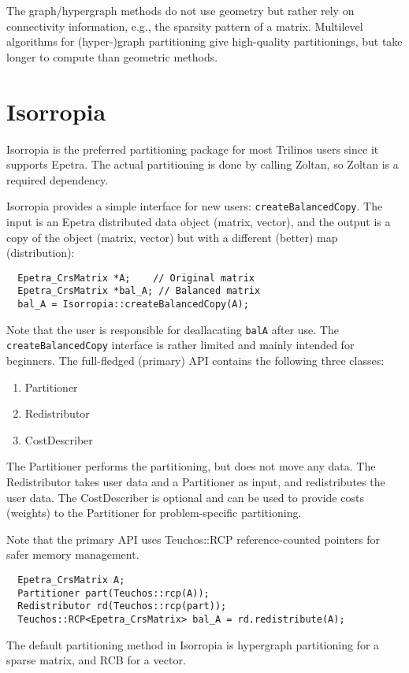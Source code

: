 The graph/hypergraph methods do not use geometry but rather rely on connectivity information, e.g., the sparsity pattern of a matrix. Multilevel algorithms for (hyper-)graph partitioning give high-quality partitionings, but take longer to compute than geometric methods.

\section{Isorropia}
\label{sec:isorropia}
Isorropia is the preferred partitioning package for most Trilinos users
since it supports Epetra. The actual partitioning is done by calling Zoltan,
so Zoltan is a required dependency.

Isorropia provides a simple interface for new users: \texttt{createBalancedCopy}. The input is an Epetra distributed data object (matrix, vector), and the output is a copy of the object (matrix, vector) but with a different (better) map (distribution):
\begin{verbatim}
  Epetra_CrsMatrix *A;    // Original matrix
  Epetra_CrsMatrix *bal_A; // Balanced matrix
  bal_A = Isorropia::createBalancedCopy(A);
\end{verbatim}
Note that the user is responsible for deallacating \texttt{balA} after use.
The \texttt{createBalancedCopy} interface is rather limited and mainly intended for beginners. The full-fledged (primary) API contains the following three classes:
\begin{enumerate}
\item Partitioner
\item Redistributor
\item CostDescriber
\end{enumerate}
The Partitioner performs the partitioning, but does not move any data. The Redistributor takes user data and a Partitioner as input, and redistributes the user data. The CostDescriber is optional and can be used to provide costs (weights) to the Partitioner for problem-specific partitioning. 

Note that the primary API uses Teuchos::RCP reference-counted pointers for safer memory management.

\begin{verbatim}
  Epetra_CrsMatrix A;
  Partitioner part(Teuchos::rcp(A));
  Redistributor rd(Teuchos::rcp(part));
  Teuchos::RCP<Epetra_CrsMatrix> bal_A = rd.redistribute(A);
\end{verbatim}

The default partitioning method in Isorropia is hypergraph partitioning for a sparse matrix, and RCB for a vector.

